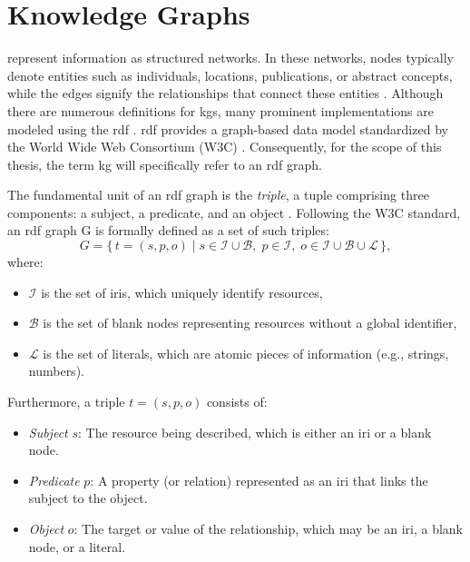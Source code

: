 

\section{Knowledge Graphs}
\label{sec:fundamentals_knowledge_graphs}

 represent information as structured networks. In these networks, nodes typically denote entities such as individuals, locations, publications, or abstract concepts, while the edges signify the relationships that connect these entities \cite{banerjee_knowledge_2024,pan_unifying_2024}. Although there are numerous definitions for \glspl{kg}, many prominent implementations are modeled using the \gls{rdf} \cite{ehrlinger_towards_2016}. \gls{rdf} provides a graph-based data model standardized by the World Wide Web Consortium (W3C) \cite{wood_rdf_2014}. Consequently, for the scope of this thesis, the term \gls{kg} will specifically refer to an \gls{rdf} graph.

The fundamental unit of an \gls{rdf} graph is the \emph{triple}, a tuple comprising three components: a subject, a predicate, and an object \cite{pan_unifying_2024,wood_rdf_2014,ji_survey_2022}. Following the W3C standard, an \gls{rdf} graph G is formally defined as a set of such triples:
\[
G = \{\, t = (s, p, o) \mid s \in \mathcal{I} \cup \mathcal{B},\; p \in \mathcal{I},\; o \in \mathcal{I} \cup \mathcal{B} \cup \mathcal{L} \,\},
\]
where:
\begin{itemize}
  \item \(\mathcal{I}\) is the set of \glspl{iri}, which uniquely identify resources,
  \item \(\mathcal{B}\) is the set of blank nodes representing resources without a global identifier,
  \item \(\mathcal{L}\) is the set of literals, which are atomic pieces of information (e.g., strings, numbers).
\end{itemize}

Furthermore, a triple \(t = (s, p, o)\) consists of:
\begin{itemize}
  \item \emph{Subject} \(s\): The resource being described, which is either an \gls{iri} or a blank node.
  \item \emph{Predicate} \(p\): A property (or relation) represented as an \gls{iri} that links the subject to the object.
  \item \emph{Object} \(o\): The target or value of the relationship, which may be an \gls{iri}, a blank node, or a literal.
\end{itemize}

